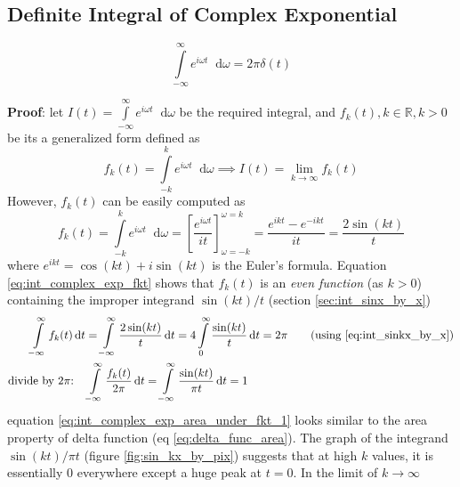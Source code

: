 \documentclass[11pt, a4paper]{article}
\newcommand{\diff}{\mathop{}\!\mathrm{d}}
\newcommand{\dt}{\diff t}
\newcommand{\domega}{\diff \omega}
\newcommand{\dint}[2]{\int \limits_{#1}^{#2}}  %
\newcommand{\intinfty}{\dint{-\infty}{\infty}}	%
\newcommand{\intzerotoinfty}{\dint{0}{\infty}}	%
\begin{document}
\subsection{Definite Integral of Complex Exponential}\label{sec:int_complex_exp}
\begin{equation}\label{eq:int_complex_exp}
\intinfty e^{i\omega t} \domega = 2\pi \delta (t)
\end{equation}

\vspace{4pt}
\textbf{Proof}: let $I(t) = \intinfty e^{i\omega t} \domega$ be the required integral, and $f_{k}(t), k\in \mathbb{R}, k > 0$ be its a generalized form defined as
\begin{equation}\label{eq:int_complex_exp_It_as_fkt}
	f_{k}(t) = \dint{-k}{k} e^{i\omega t} \domega \implies I(t) = \lim\limits_{k \to \infty} f_{k}(t)
\end{equation}
However, $f_{k}(t)$ can be easily computed as
\begin{equation}\label{eq:int_complex_exp_fkt}
	f_{k}(t) = \dint{-k}{k} e^{i\omega t} \domega = \left[\frac{e^{i\omega t}}{it}\right]_{\omega=-k}^{\omega=k} = \frac{e^{ikt} - e^{-ikt}}{it} = \frac{2\sin(kt)}{t}
\end{equation}
where $e^{ikt}=\cos(kt) + i\sin(kt)$ is the Euler's formula. Equation \eqref{eq:int_complex_exp_fkt} shows that $f_{k}(t)$ is an \textit{even function} (as $k > 0$) containing the improper integrand $\sin(kt)/t$ (section \ref{sec:int_sinx_by_x})
\begin{align}
	\intinfty f_{k}(t) \dt & = \intinfty \frac{2\sin(kt)}{t} \dt = 4 \intzerotoinfty \frac{\sin(kt)}{t} \dt = 2\pi	\tag{using \eqref{eq:int_sinkx_by_x}} \nonumber \\
	\text{divide by $2\pi$:} \quad & \intinfty \frac{f_{k}(t)}{2\pi} \dt = \intinfty \frac{\sin(kt)}{\pi t} \dt = 1 \label{eq:int_complex_exp_area_under_fkt_1}
\end{align}
equation \eqref{eq:int_complex_exp_area_under_fkt_1} looks similar to the area property of delta function (eq \eqref{eq:delta_func_area}). The graph of the integrand $\sin(kt)/\pi t$ (figure \ref{fig:sin_kx_by_pix}) suggests that at high $k$ values, it is essentially $0$ everywhere except a huge peak at $t=0$. In the limit of $k \to \infty$
\end{document}
